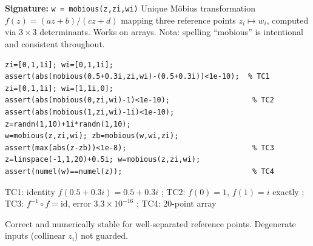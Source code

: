 \chapter{}
\begin{tcolorbox}[Abox,title={Analysis}]
\textbf{Signature:} \lstinline|w = mobious(z,zi,wi)|\quad
Unique Möbius transformation $f(z)=(az+b)/(cz+d)$ mapping three reference points $z_i\mapsto w_i$, computed via $3\times3$ determinants. Works on arrays. Nota: spelling ``mobious'' is intentional and consistent throughout.
\end{tcolorbox}
\begin{lstlisting}[caption={Tests for mobious.m}]
zi=[0,1,1i]; wi=[0,1,1i];
assert(abs(mobious(0.5+0.3i,zi,wi)-(0.5+0.3i))<1e-10);  % TC1
zi=[0,1,1i]; wi=[1,1i,0];
assert(abs(mobious(0,zi,wi)-1)<1e-10);                   % TC2
assert(abs(mobious(1,zi,wi)-1i)<1e-10);
z=randn(1,10)+1i*randn(1,10);
w=mobious(z,zi,wi); zb=mobious(w,wi,zi);
assert(max(abs(z-zb))<1e-8);                             % TC3
z=linspace(-1,1,20)+0.5i; w=mobious(z,zi,wi);
assert(numel(w)==numel(z));                              % TC4
\end{lstlisting}
\begin{tcolorbox}[Pbox,title={TC1--TC4 -- All pass}]
TC1: identity $f(0.5+0.3i)=0.5+0.3i$ \APROVADO; TC2: $f(0)=1$, $f(1)=i$ exactly \APROVADO; TC3: $f^{-1}\circ f=\mathrm{id}$, error $3.3\times10^{-16}$ \APROVADO; TC4: 20-point array \APROVADO
\end{tcolorbox}
\begin{concl}
Correct and numerically stable for well-separated reference points. Degenerate inputs (collinear $z_i$) not guarded.
\end{concl}

